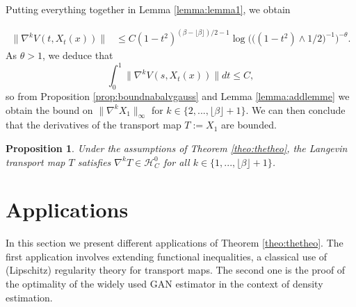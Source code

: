 \documentclass{article}
\newtheorem{proposition}{Proposition}
\begin{document}
Putting everything together in Lemma \ref{lemma:lemma1}, we obtain 

\begin{align}\label{align:conclubanblakbound1}
     \|\nabla^{k} V(t,X_t(x))\|& \leq  C(1-t^2)^{(\beta-\lfloor \beta \rfloor)/2-1}\log\Big(\big((1-t^2)\wedge 1/2\big)^{-1}\Big)^{-\theta}.
\end{align}
As $\theta>1$, we deduce that 
$$\int_0^1\|\nabla^{k} V(s,X_t(x))\|dt\leq  C,$$
so from Proposition \ref{prop:boundnabalvgauss} and Lemma \ref{lemma:addlemme}  we obtain the bound on $\|\nabla^k X_1\|_\infty$ for $k\in\{2,...,\lfloor \beta \rfloor +1\}$.   We can then conclude that the derivatives of the transport map $T:= X_1$ are bounded.

\begin{proposition}
    Under the assumptions of Theorem \ref{theo:thetheo}, the Langevin transport map $T$ satisfies 
    $\nabla^k T \in \mathcal{H}^0_C$ for all $k\in\{1,...,\lfloor \beta \rfloor +1\}$.
\end{proposition}

















\section{Applications}\label{sec:app}
In this section we present different applications of Theorem \ref{theo:thetheo}. The first application involves extending functional inequalities, a classical use of (Lipschitz) regularity theory for transport maps. The second one is the proof of the optimality of the widely used GAN estimator in the context of density estimation. 
\end{document}
